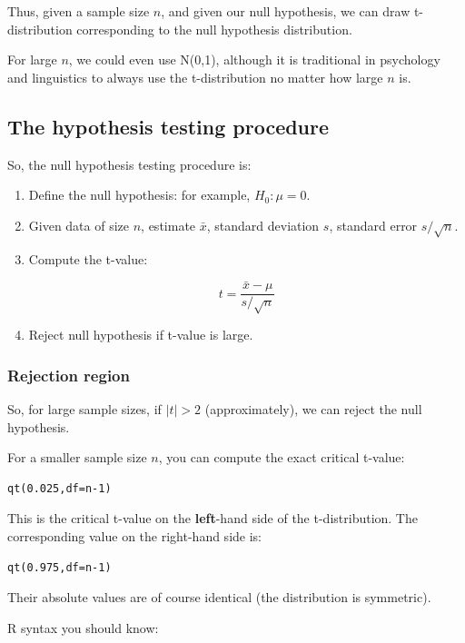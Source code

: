 \documentclass[12pt]{article}
\begin{document}
Thus, given a sample size $n$, and given our null hypothesis, we can draw t-distribution corresponding to the null hypothesis distribution.

For large $n$, we could even use N(0,1), although it is traditional in psychology and linguistics to always use the t-distribution no matter how large $n$ is.

\subsection{The hypothesis testing procedure}

So, the null hypothesis testing procedure is:

\begin{enumerate}
\item Define the null hypothesis: for example, $H_0: \mu = 0$.
\item Given data of size $n$, estimate $\bar{x}$, standard deviation $s$, standard error $s/\sqrt{n}$.
\item Compute the t-value:

\begin{equation}
t=\frac{\bar{x}-\mu}{s/\sqrt{n}}
\end{equation}
\item Reject null hypothesis if t-value is large.
\end{enumerate}

\subsubsection{Rejection region}

So, for large sample sizes, if $\mid t\mid >2$ (approximately), we can reject the null hypothesis. 

For a smaller sample size $n$, you can compute the exact critical t-value:

\begin{verbatim}
qt(0.025,df=n-1)
\end{verbatim}

This is the critical t-value on the \textbf{left}-hand side of the t-distribution.
The corresponding value on the right-hand side is:

\begin{verbatim}
qt(0.975,df=n-1)
\end{verbatim}

Their absolute values are of course identical (the distribution is symmetric).

R syntax you should know: 
\end{document}
